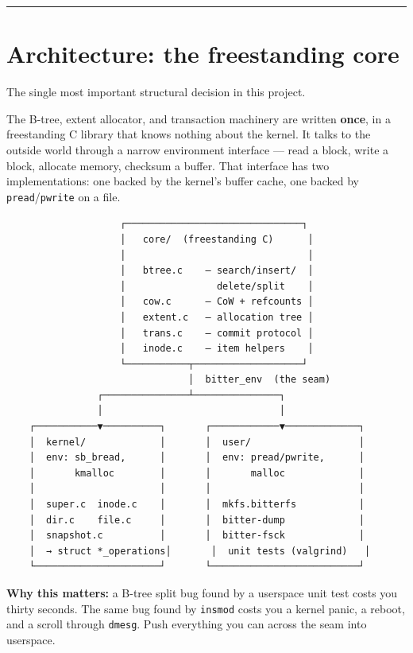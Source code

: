 \begin{center}\rule{0.5\linewidth}{0.5pt}\end{center}

\hypertarget{architecture-the-freestanding-core}{%
\section{Architecture: the freestanding core}\label{architecture-the-freestanding-core}}

The single most important structural decision in this project.

The B-tree, extent allocator, and transaction machinery are written \textbf{once}, in a
freestanding C library that knows nothing about the kernel. It talks to the outside world
through a narrow environment interface --- read a block, write a block, allocate memory,
checksum a buffer. That interface has two implementations: one backed by the kernel's
buffer cache, one backed by \texttt{pread}/\texttt{pwrite} on a file.

\begin{verbatim}
                    ┌───────────────────────────────┐
                    │   core/  (freestanding C)      │
                    │                                │
                    │   btree.c    — search/insert/  │
                    │                delete/split    │
                    │   cow.c      — CoW + refcounts │
                    │   extent.c   — allocation tree │
                    │   trans.c    — commit protocol │
                    │   inode.c    — item helpers    │
                    └───────────┬───────────────────┘
                                │  bitter_env  (the seam)
                ┌───────────────┴───────────────┐
                │                               │
    ┌───────────▼──────────┐       ┌────────────▼─────────────┐
    │  kernel/             │       │  user/                   │
    │  env: sb_bread,      │       │  env: pread/pwrite,      │
    │       kmalloc        │       │       malloc             │
    │                      │       │                          │
    │  super.c  inode.c    │       │  mkfs.bitterfs           │
    │  dir.c    file.c     │       │  bitter-dump             │
    │  snapshot.c          │       │  bitter-fsck             │
    │  → struct *_operations│       │  unit tests (valgrind)   │
    └──────────────────────┘       └──────────────────────────┘
\end{verbatim}

\textbf{Why this matters:} a B-tree split bug found by a userspace unit test costs you thirty
seconds. The same bug found by \texttt{insmod} costs you a kernel panic, a reboot, and a
scroll through \texttt{dmesg}. Push everything you can across the seam into userspace.

